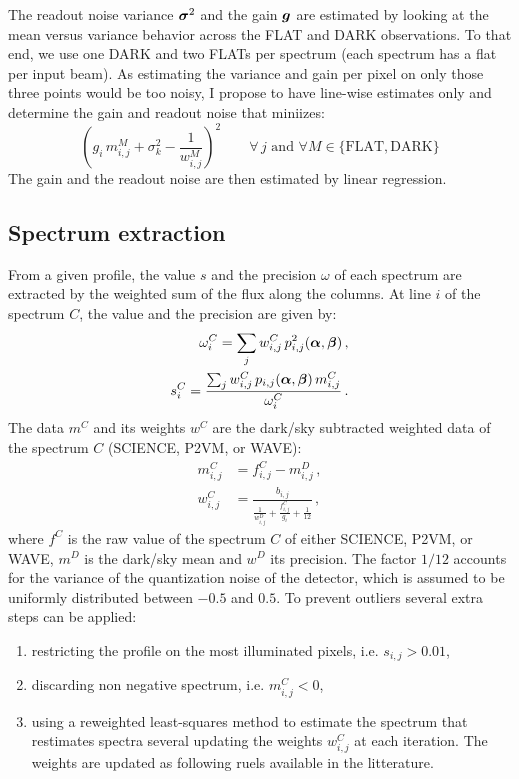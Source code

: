 \documentclass[a4paper,11pt,twoside]{scrartcl}
\newcommand{\rd}{f} %
\newcommand{\data}{m}
\newcommand{\spec}{s}
\newcommand{\profile}{p}
\begin{document}
The readout noise variance $\boldsymbol{\sigma}^2$ and the gain $\boldsymbol{g}$ are estimated by looking at the mean versus variance behavior across the FLAT and DARK observations. To that end, we use one DARK and two FLATs per spectrum (each spectrum has a flat per input beam). As estimating the variance and gain per pixel on only those three points would be too noisy, I propose to have line-wise estimates only and determine the gain and readout noise that miniizes:
\begin{equation}
    \left(g_i\, \data_{i,j}^M + \sigma_k^2 - \frac{1}{w^M_{i,j}} \right)^2 \qquad \forall\, j \text{ and } \forall  M \in \{ \textrm{FLAT},  \textrm{DARK}\}
\end{equation}
The gain and the readout noise are then estimated by linear regression.

\subsection{Spectrum extraction}
From a given profile, the value $\spec$ and the precision $\omega$ of each spectrum are extracted by the weighted sum of the flux along the columns. At line $i$ of the spectrum $C$, the value and the precision are given by:
 \begin{align}
    \omega^C_i = \sum_j w^C_{i,j} \, \profile^2_{i,j}(\V \alpha, \V\beta)\,, \\
    \spec^C_i = \frac{\sum_j w^C_{i,j} \, \profile_{i,j}(\V \alpha, \V\beta)\, \data^C_{i,j}}{\omega^C_i}\,.
\end{align}
The data $\data^C$ and its weights $w^C$ are the dark/sky subtracted weighted data of the spectrum $C$ (SCIENCE, P2VM, or WAVE):
\begin{align}
    \data^C_{i,j} &= \rd^C_{i,j} - \data^D_{i,j}\,, \\
    w^C_{i,j} &= \frac{b_{i,j}}{ \frac{1}{w^D_{i,j}} + \frac{ \rd^C_{i,j}}{g_i} + \frac{1}{12}} \,,
\end{align}
where $\rd^C$ is the raw value of the spectrum $C$ of either SCIENCE, P2VM, or WAVE, $\data^D$ is the dark/sky mean and $w^D$ its precision. The factor $1/12$  accounts for  the variance of the quantization noise of the detector, which is assumed to be uniformly distributed between $-0.5$ and $0.5$.
To prevent outliers several extra steps can be applied:
\begin{enumerate}
    \item restricting the profile on the most illuminated pixels, i.e.  $s_{i,j} > 0.01$,
    \item discarding non negative spectrum, i.e. $\data^C_{i,j} < 0$,
    \item using a reweighted least-squares method to estimate the spectrum that restimates spectra several updating the weights $w^C_{i,j}$ at each iteration. The weights are updated as following ruels available in the litterature.
\end{enumerate}
\end{document}
